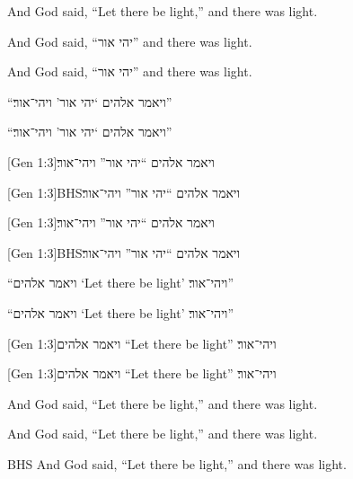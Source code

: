 \documentclass[12pt]{article}
\begin{document}
And God said, \enquote{Let there be light,} and there was light.



And God said, \foreignquote{hebrew}{יהי אור} and there was light.

And God said, \hyphenquote{hebrew}{יהי אור} and there was light.



\foreignquote{hebrew}{ויאמר אלהים \enquote{יהי אור} ויהי־אור׃}

\hyphenquote{hebrew}{ויאמר אלהים \enquote{יהי אור} ויהי־אור׃}

[Gen 1:3]{ויאמר אלהים \enquote{יהי אור} ויהי־אור׃}

[Gen 1:3]{BHS}{ויאמר אלהים \enquote{יהי אור} ויהי־אור׃}

[Gen 1:3]{ויאמר אלהים \enquote{יהי אור} ויהי־אור׃}

[Gen 1:3]{BHS}{ויאמר אלהים \enquote{יהי אור} ויהי־אור׃}

\foreignquote{hebrew}{ויאמר אלהים \foreignquote{english}{Let there be light}
ויהי־אור׃}

\hyphenquote{hebrew}{ויאמר אלהים \hyphenquote{english}{Let there be light}
ויהי־אור׃}

[Gen 1:3]{ויאמר אלהים \foreignquote{english}{Let
there be light} ויהי־אור׃}

[Gen 1:3]{ויאמר אלהים \hyphenquote{english}{Let there
be light} ויהי־אור׃}

\begin{displayquote}
  And God said, \enquote{Let there be light,} and there was light.
\end{displayquote}

\begin{displayquote}[Gen 1:3]
  And God said, \enquote{Let there be light,} and there was light.
\end{displayquote}

\begin{displaycquote}[Gen 1:3]{BHS}
  And God said, \enquote{Let there be light,} and there was light.
\end{displaycquote}
\end{document}
